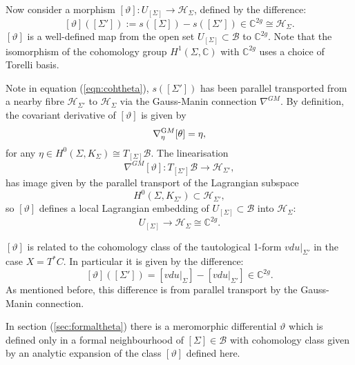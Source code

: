     Now consider a morphism \([\vartheta]:U_{[\Sigma]}\rightarrow \mathcal{H}_\Sigma\), defined by the difference:
    \begin{equation}  
    \label{eqn:cohtheta}
    [\vartheta]([\Sigma']):=s([\Sigma])-s([\Sigma'])\in\mathbb{C}^{2g}\cong \mathcal{H}_\Sigma.
    \end{equation}
    \( [\vartheta ]\) is a well-defined map from  the open set \(U_{[\Sigma]}\subset\mathcal{B}\) to \(\mathbb{C}^{2g}\). Note that the isomorphism of the cohomology group \(H^1(\Sigma, \mathbb{C})\) with \( \mathbb{C}^{2g}\) uses a choice of Torelli basis. 
    
    Note in equation (\ref{eqn:cohtheta}), \(s([\Sigma'])\) has been parallel transported from a nearby fibre \(\mathcal{H}_{\Sigma'}\) to \(  \mathcal{H}_\Sigma\) via the Gauss-Manin connection \( \nabla^{GM}\). By definition, the covariant derivative of \( [\vartheta]\) is given by
    \[ \nabla^{\text GM}_\eta[\theta]=\eta, \]
    for any \(\eta\in H^0(\Sigma, K_{\Sigma})\cong T_{[\Sigma]}\mathcal{B}\).  The linearisation 
    \[ \nabla^{GM}[\vartheta] : T_{[\Sigma']}\mathcal{B} \rightarrow \mathcal{H}_{\Sigma'}, \] 
    has image given by the parallel transport of the Lagrangian subspace \[ H^0(\Sigma, K_{\Sigma'})\subset \mathcal{H}_{\Sigma'},\] 
    so \( [\vartheta]\) defines a local Lagrangian embedding of \( U_{[\Sigma]} \subset\mathcal{B} \)  into \(\mathcal{H}_\Sigma\):
    \begin{equation}  \label{eqn:Bemb}
    U_{[\Sigma]} {\longrightarrow}\mathcal{H}_\Sigma\cong\mathbb{C}^{2g}.
    \end{equation}
    
    \([\vartheta]\) is related to the cohomology class of the tautological 1-form \( vdu|_{\Sigma'}\) in the case \(X=T^*C\). In particular it is given by the difference:
    \[ [\vartheta]([\Sigma'])=\left[vdu|_{\Sigma}\right]-\left[vdu|_{\Sigma'}\right]\in\mathbb{C}^{2g}.\]
    As mentioned before, this difference is from parallel transport by the Gauss-Manin connection.  
    
    In section (\ref{sec:formaltheta}) there is a meromorphic differential \(\vartheta\) which is defined only in a formal neighbourhood of \([\Sigma]\in\mathcal{B}\) with cohomology class given by an analytic expansion of the class \( [\vartheta]\) defined here.
    
